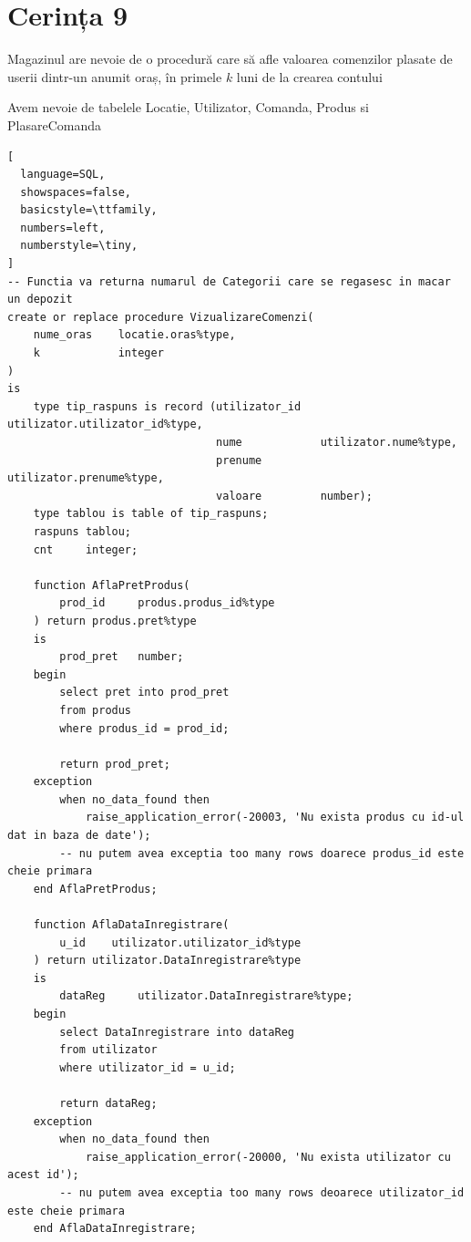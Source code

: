 \documentclass[12pt]{article}
\begin{document}
\pagebreak

\section{Cerința 9}
Magazinul are nevoie de o procedură care să afle valoarea comenzilor plasate de userii
dintr-un anumit oraș, în primele $k$ luni de la crearea contului

Avem nevoie de tabelele Locatie, Utilizator, Comanda, Produs si PlasareComanda

\vspace{0.5em}

\begin{lstlisting}[
  language=SQL,
  showspaces=false,
  basicstyle=\ttfamily,
  numbers=left,
  numberstyle=\tiny,
]
-- Functia va returna numarul de Categorii care se regasesc in macar un depozit
create or replace procedure VizualizareComenzi(
    nume_oras    locatie.oras%type,
    k            integer
)
is
    type tip_raspuns is record (utilizator_id   utilizator.utilizator_id%type,
                                nume            utilizator.nume%type,
                                prenume         utilizator.prenume%type,
                                valoare         number);
    type tablou is table of tip_raspuns;
    raspuns tablou;
    cnt     integer;
    
    function AflaPretProdus(
        prod_id     produs.produs_id%type
    ) return produs.pret%type
    is
        prod_pret   number;
    begin
        select pret into prod_pret
        from produs
        where produs_id = prod_id;
        
        return prod_pret;
    exception
        when no_data_found then
            raise_application_error(-20003, 'Nu exista produs cu id-ul dat in baza de date');
        -- nu putem avea exceptia too many rows doarece produs_id este cheie primara
    end AflaPretProdus;
    
    function AflaDataInregistrare(
        u_id    utilizator.utilizator_id%type
    ) return utilizator.DataInregistrare%type
    is
        dataReg     utilizator.DataInregistrare%type;
    begin
        select DataInregistrare into dataReg
        from utilizator
        where utilizator_id = u_id;
        
        return dataReg;
    exception
        when no_data_found then
            raise_application_error(-20000, 'Nu exista utilizator cu acest id');
        -- nu putem avea exceptia too many rows deoarece utilizator_id este cheie primara
    end AflaDataInregistrare;        
    

\end{lstlisting}
\end{document}
